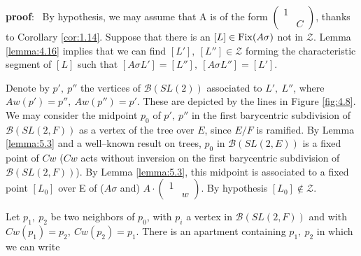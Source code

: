 \documentclass[12pt,letterpaper]{amsart}
\numberwithin{equation}{section}
\theoremstyle{definition}
\theoremstyle{plain}
\providecommand{\cal}{\mathcal}
\def\bbb{{\cal B}}
\def\zz{{\cal Z}}
\def\pf{{\bf proof}:\ }
\begin{document}
\pf 
By hypothesis, we may assume that A is of the form
$\left(\begin{array}{cc} 1 &\ \\ \ &C\end{array}\right)$, 
thanks to Corollary \ref{cor:1.14}.
Suppose that there is an $[L]\in {\rm Fix}(A\sigma )$ not in $\zz$. 
Lemma \ref{lemma:4.16}
implies that we can find $[L'],\ [L'']\in\zz$ forming the characteristic
segment of $[L]$ such that
$[A\sigma L'] = [L''],\ [A\sigma L''] = [L']$. 

Denote by $p',\ p''$
the vertices of $\bbb (SL(2))$ associated to $L',\ L''$,
where $Aw(p')=p'',\ Aw(p'')=p'$.
These are depicted by the lines in Figure \ref{fig:4.8}.
We may consider the midpoint $p_0$ of $p',\ p''$ in the first barycentric
subdivision of $\bbb (SL(2,F))$ as a vertex of the tree over $E$, since
$E/F$ is ramified. By Lemma \ref{lemma:5.3} and a
well--known result on trees, $p_0$ in $\bbb (SL(2,E))$ is a fixed point
of $Cw$ ($Cw$ acts without inversion on the first barycentric subdivision
of $\bbb (SL(2,F))$). By Lemma \ref{lemma:5.3}, this midpoint
is associated to a fixed point $[L_0]$ over E of ($A\sigma$ and)
$A\cdot\left(\begin{array}{cc}
1&\ \\\ &w\end{array}\right)$. By hypothesis 
$[L_0]\notin \zz$.
 
Let
$p_1,\ p_2$ be two neighbors of $p_0$, with $p_i$ a vertex in
$\bbb (SL(2,F))$ and with $Cw(p_1)=p_2,\ Cw(p_2)=p_1$. There is an
apartment containing $p_1,\ p_2$ in which we can write
\end{document}
